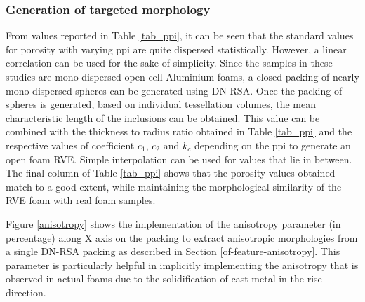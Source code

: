 \subsubsection{Generation of targeted morphology}
From values reported in Table \ref{tab_ppi}, it can be seen that the standard values for porosity with varying ppi are quite dispersed statistically. However, a linear correlation can be used for the sake of simplicity. Since the samples in these studies are mono-dispersed open-cell Aluminium foams, a closed packing  of nearly mono-dispersed spheres can be generated using DN-RSA. Once the packing of spheres is generated, based on individual tessellation volumes, the mean characteristic length of the inclusions can be obtained. This value can be combined with the thickness to radius ratio obtained in Table \ref{tab_ppi} and the respective values of coefficient $ c_1 $, $ c_2 $ and $ k_c $ depending on the ppi to generate an open foam RVE. Simple interpolation can be used for values that lie in between. The final column of Table \ref{tab_ppi} shows that the porosity values obtained match to a good extent, while maintaining the morphological similarity of the RVE foam with real foam samples.

{Figure \ref{anisotropy} shows the implementation of the anisotropy parameter (in percentage) along X axis on the packing to extract anisotropic morphologies from a single DN-RSA packing as described in Section \ref{of-feature-anisotropy}. This parameter is particularly helpful in implicitly implementing the anisotropy that is observed in actual foams due to the solidification of cast metal in the rise direction.}

